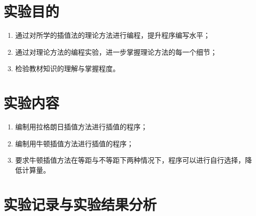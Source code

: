 






\newcommand{\ThisProjectTitle}{插值法}
\newcommand{\ThisDate}{2017年11月29日}
\newcommand{\ThisNo}{No.3}






\section{实验目的}
\begin{enumerate}[leftmargin=1.4cm, itemsep=-0.5mm]
    \item 通过对所学的插值法的理论方法进行编程，提升程序编写水平；
    \item 通过对理论方法的编程实验，进一步掌握理论方法的每一个细节；
    \item 检验教材知识的理解与掌握程度。
\end{enumerate}

\section{实验内容}
\begin{enumerate}[leftmargin=1.4cm, itemsep=-0.5mm]
    \item 编制用拉格朗日插值方法进行插值的程序；
    \item 编制用牛顿插值方法进行插值的程序；
    \item 要求牛顿插值方法在等距与不等距下两种情况下，程序可以进行自行选择，降低计算量。
\end{enumerate}



\section{实验记录与实验结果分析}

